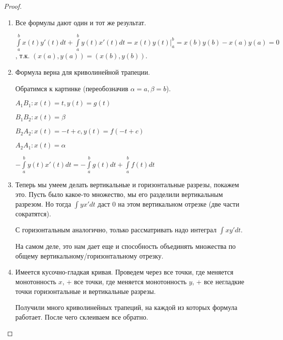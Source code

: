     \begin{proof}

        \begin{enumerate}

            \item Все формулы дают один и тот же результат.

            $\int\limits_a^b x(t)y'(t) dt + \int\limits_a^b y(t)x'(t) dt = x(t)y(t) \bigg|_a^b = x(b)y(b) - x(a)y(a) = 0$, т.к. $(x(a), y(a)) = (x(b), y(b))$.

            \item Формула верна для криволинейной трапеции.

            Обратимся к картинке (переобозначив $\alpha = a, \beta = b$).

            $A_1B_1 \colon x(t) = t, y(t) = g(t)$

            $B_1B_2 \colon x(t) = \beta$

            $B_2A_2 \colon x(t) = -t + c, y(t) = f(-t + c)$

            $A_2A_1 \colon x(t) = \alpha$

            $-\int\limits_a^b y(t)x'(t) dt = -\int\limits_a^b g(t) dt + \int\limits_a^b f(t) dt$

            \item Теперь мы умеем делать вертикальные и горизонтальные разрезы, покажем это. 
            Пусть было какое-то множество, мы его разделили вертикальным разрезом. 
            Но тогда $\int y x' dt$ даст 0 на этом вертикальном отрезке (две части сократятся).

            С горизонтальным аналогично, только рассматривать надо интеграл $\int x y' dt$.

            На самом деле, это нам дает еще и способность объединять множества по общему вертикальному/горизонтальному отрезку.

            \item Имеется кусочно-гладкая кривая. 
            Проведем через все точки, где меняется монотонность $x$, + все точки, где меняется монотонность $y$, + все негладкие точки горизонтальные и вертикальные разрезы.
            
            Получили много криволинейных трапеций, на каждой из которых формула работает. После чего склеиваем все обратно.

        \end{enumerate}

    \end{proof}

